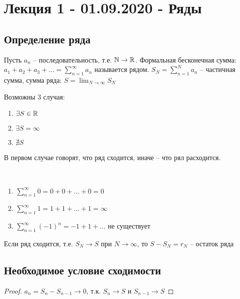 \section{Лекция 1 - 01.09.2020 - Ряды}
\subsection{Определение ряда}
\begin{definition}
Пусть $a_{n}$ -- последовательность, т.е. $\mathbb{N} \rightarrow \mathbb{R}$. Формальная бесконечная сумма: $a_1 + a_2 + a_3 + \dots = \sum_{n=1}^{\infty} a_n$ называется рядом.
$S_N = \sum_{n = 1}^{N} a_n$ -- частичная сумма, сумма ряда: $S = \lim_{N \rightarrow \infty} S_N$
\end{definition}

Возможны 3 случая:
\begin{enumerate}
    \item $\exists S \in \mathbb{R}$
    \item $\exists S = \infty$
    \item $\nexists S$
\end{enumerate}

В первом случае говорят, что ряд сходится, иначе -- что рял расходится.

\begin{example}~
    \begin{enumerate}
        \item $\sum_{n = 1}^{\infty} 0 = 0 + 0 + \dots + 0 = 0$
        \item $\sum_{n = 1}^{\infty} 1 = 1 + 1 + \dots + 1 = \infty$
        \item $\sum_{n = 1}^{\infty} (-1)^{n} = -1 + 1 + \dots$ не существует
    \end{enumerate}
\end{example}

\begin{definition}
    Если ряд сходится, т.е. $S_N \rightarrow S$ при $N \rightarrow \infty$, то $S - S_N = r_N$ -- остаток ряда
\end{definition}

\subsection{Необходимое условие сходимости}
\begin{comment}~
    Если ряд сходится, то $a_n \rightarrow 0$
\end{comment}
\begin{proof}
    $a_n = S_n - S_{n - 1} \rightarrow 0$, т.к. $S_n \rightarrow S$ и $S_{n - 1} \rightarrow S$
\end{proof}
